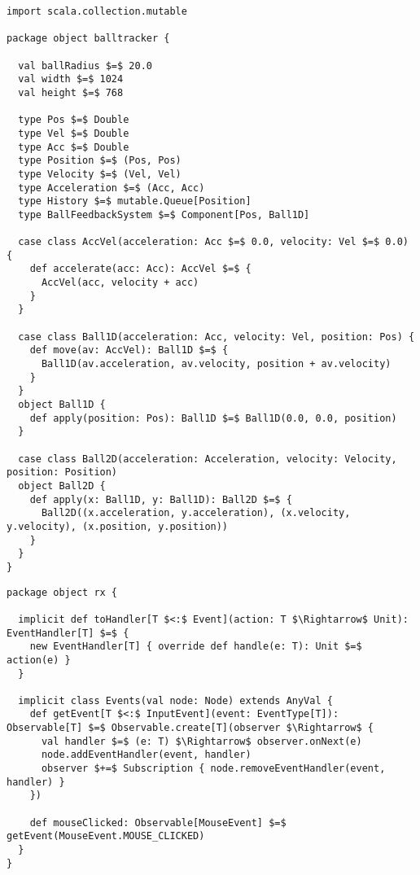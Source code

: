 \begin{minipage}{\linewidth}
\begin{lstlisting}[style=ScalaStyle, caption={Ball movement control}, label={lst:ball-full-utils-reactive}]
import scala.collection.mutable

package object balltracker {

  val ballRadius $=$ 20.0
  val width $=$ 1024
  val height $=$ 768

  type Pos $=$ Double
  type Vel $=$ Double
  type Acc $=$ Double
  type Position $=$ (Pos, Pos)
  type Velocity $=$ (Vel, Vel)
  type Acceleration $=$ (Acc, Acc)
  type History $=$ mutable.Queue[Position]
  type BallFeedbackSystem $=$ Component[Pos, Ball1D]

  case class AccVel(acceleration: Acc $=$ 0.0, velocity: Vel $=$ 0.0) {
    def accelerate(acc: Acc): AccVel $=$ {
      AccVel(acc, velocity + acc)
    }
  }

  case class Ball1D(acceleration: Acc, velocity: Vel, position: Pos) {
    def move(av: AccVel): Ball1D $=$ {
      Ball1D(av.acceleration, av.velocity, position + av.velocity)
    }
  }
  object Ball1D {
    def apply(position: Pos): Ball1D $=$ Ball1D(0.0, 0.0, position)
  }

  case class Ball2D(acceleration: Acceleration, velocity: Velocity, position: Position)
  object Ball2D {
    def apply(x: Ball1D, y: Ball1D): Ball2D $=$ {
      Ball2D((x.acceleration, y.acceleration), (x.velocity, y.velocity), (x.position, y.position))
    }
  }
}
\end{lstlisting}
\end{minipage}

\begin{minipage}{\linewidth}
\begin{lstlisting}[style=ScalaStyle, caption={JavaFx/Rx interface}, label={lst:ball-full-rx-reactive}]
package object rx {

  implicit def toHandler[T $<:$ Event](action: T $\Rightarrow$ Unit): EventHandler[T] $=$ {
    new EventHandler[T] { override def handle(e: T): Unit $=$ action(e) }
  }

  implicit class Events(val node: Node) extends AnyVal {
    def getEvent[T $<:$ InputEvent](event: EventType[T]): Observable[T] $=$ Observable.create[T](observer $\Rightarrow$ {
      val handler $=$ (e: T) $\Rightarrow$ observer.onNext(e)
      node.addEventHandler(event, handler)
      observer $+=$ Subscription { node.removeEventHandler(event, handler) }
    })

    def mouseClicked: Observable[MouseEvent] $=$ getEvent(MouseEvent.MOUSE_CLICKED)
  }
}
\end{lstlisting}
\end{minipage}
